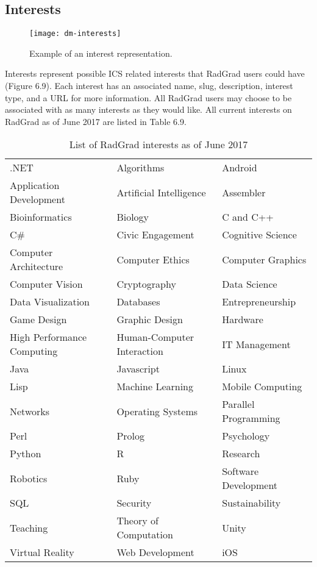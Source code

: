 \subsection{Interests}
\begin{figure}[h]
\centering
\texttt{[image: dm-interests]}
\caption{Example of an interest representation.}
\end{figure}
Interests represent possible ICS related interests that RadGrad users could have (Figure 6.9). Each interest has an associated name, slug, description, interest type, and a URL for more information. All RadGrad users may choose to be associated with as many interests as they would like. All current interests on RadGrad as of June 2017 are listed in Table 6.9.

\begin{table}[h!]
\centering
\begin{tabular}{ l l l } 
.NET & Algorithms & Android \\ 
Application Development & Artificial Intelligence & Assembler \\
Bioinformatics & Biology & C and C++ \\
C\# & Civic Engagement & Cognitive Science \\
Computer Architecture & Computer Ethics & Computer Graphics \\
Computer Vision & Cryptography & Data Science \\
Data Visualization & Databases & Entrepreneurship \\
Game Design & Graphic Design & Hardware \\
High Performance Computing & Human-Computer Interaction & IT Management \\
Java & Javascript & Linux \\
Lisp & Machine Learning & Mobile Computing \\
Networks & Operating Systems & Parallel Programming \\
Perl & Prolog & Psychology \\
Python & R & Research \\
Robotics & Ruby & Software Development \\
SQL & Security & Sustainability \\
Teaching & Theory of Computation & Unity \\
Virtual Reality & Web Development & iOS
\end{tabular}
\caption{List of RadGrad interests as of June 2017}
\label{table:2}
\end{table}

